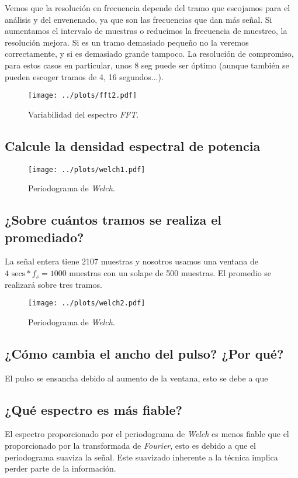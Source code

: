 \documentclass{article}
\begin{document}
Vemos que la resolución en frecuencia depende del tramo que escojamos
para el análisis y del envenenado, ya que son las frecuencias que dan
más señal. Si aumentamos el intervalo de muestras o reducimos la
frecuencia de muestreo, la resolución mejora. Si es un tramo demasiado
pequeño no la veremos correctamente, y si es demasiado grande tampoco.
La resolución de compromiso, para estos casos en particular, unos 8
seg puede ser óptimo (aunque también se pueden escoger tramos de  4,
16 segundos...).

\vfill
\begin{figure}[h]
\centering
\texttt{[image: ../plots/fft2.pdf]}
\vspace{-1.5cm}
\caption{Variabilidad del espectro \textit{FFT}.}
\label{fig:LABEL_NAME}
\end{figure}
\vfill
\newpage

\subsection{Calcule la densidad espectral de potencia}

\begin{figure}[h]
\centering
\texttt{[image: ../plots/welch1.pdf]}
\vspace{-1cm}
\caption{Periodograma de \textit{Welch}.}
\label{fig:welch}
\end{figure}


\vfill
\subsection{¿Sobre cuántos tramos se realiza el promediado?}

La señal entera tiene 2107 muestras y nosotros usamos una ventana de
$4 \text{ secs} * f_{s} = 1000$ muestras con un solape de 500 muestras.
El promedio se realizará sobre tres tramos.

\begin{figure}[h]
\centering
\texttt{[image: ../plots/welch2.pdf]}
\vspace{-1cm}
\caption{Periodograma de \textit{Welch}.}
\label{fig:welch}
\end{figure}

\subsection{¿Cómo cambia el ancho del pulso? ¿Por qué?}

El pulso se ensancha debido al aumento de la ventana, esto se debe a
que

\subsection{¿Qué espectro es más fiable?}

El espectro proporcionado por el periodograma de \textit{Welch} es
menos fiable que el proporcionado por la transformada de
\textit{Fourier}, esto es debido a que el periodograma suaviza la
señal. Este suavizado inherente a la técnica implica
perder parte de la información.
\end{document}
